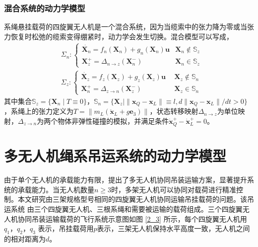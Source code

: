 \documentclass[lang=chs, degree=master, blindreview=false, winfonts=true]{yanputhesis}
\begin{document}
\subsubsection{混合系统的动力学模型}
系绳悬挂载荷的四旋翼无人机是一个混合系统，因为当缆索中的张力降为零或当张力恢复时松弛的缆索变得绷紧时，动力学会发生切换。混合模型可以写成，
\begin{equation}
	\left.\begin{aligned}&\Sigma_{n}:\left\{\begin{array}{ll}\dot{\bm X_n}= f_n(\bm X_n)+ g_n(\bm X_n)\bm u  &\bm X_n\notin \mathbb{S}_z\\\bm X_z^+=\Delta_{n\to z}(\bm X_n^-)  &\bm X_n\in \mathbb{S}_z\end{array}\right.\\&\Sigma_{z}:\left\{\begin{array}{ll}\dot{\bm X_z}=f_z(\bm X_z) + g_z(\bm X_z)\bm u \ \ &\bm X_z\notin \mathbb{S}_n\\\bm X_n^+=\Delta_{z\to n}(\bm X_z^-) \ &\bm X_z\in \mathbb{S}_n\end{array}\right.\end{aligned}\right.
\end{equation}
其中集合$\mathbb S_z = \{ \bm X_n \mid  T \equiv 0 \}$，$\mathbb S_n = \{ \bm X_z \mid \|\bm x_Q - \bm x_L\| \equiv l, d \|\bm x_Q - \bm x_L\| /dt> 0 \}$，系绳上的张力定义为$ T = \|m_L (\ddot{\bm x}_L + g\bm{e}_3)\|$，状态转移映射$\Delta_{n\to z}$为单位映射，$\Delta_{z\to n}$为两个物体非弹性碰撞的模拟，并满足条件$\dot{\bm x}_Q^+-\dot{\bm x}_L^+=0$。

\section{多无人机绳系吊运系统的动力学模型}
由于单个无人机的承载能力有限，提出了多无人机协同吊装运输方案，显著提升系统的承载能力。当无人机数量$n\geq3$时，多架无人机可以协同对载荷进行精准控制\cite{fink2011planning}。本文研究由三架规格型号相同的四旋翼无人机协同运输吊挂载荷的问题。该吊运系统
由三个四旋翼无人机、三根系绳和需要被运输的载荷组成。三个四旋翼无人机协同吊装运输载荷的飞行系统示意图如图 \ref{2_3} 所示，每个四旋翼无人机用
$q_1$，$q_2$，$q_3$ 表示，吊挂载荷用$p$表示，三架无人机保持水平高度一致，无人机之间的相对距离为$d$。
\end{document}
